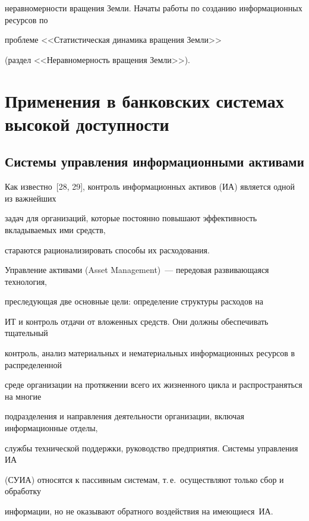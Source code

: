 неравномерности вращения Земли. Начаты работы по созданию информационных ресурсов по 


проблеме <<Статистическая динамика вращения Земли>>


(раздел <<Неравномерность вращения Земли>>).





\section{Применения в банковских системах высокой доступности}





\subsection*{Системы управления информационными активами}





Как известно~[28, 29], контроль информационных активов (ИА) является одной из важнейших 


задач для организаций, которые постоянно повышают эффективность вкладываемых ими средств, 


стараются рационализировать способы их расходования.


Управление активами (Asset Management)~--- передовая развивающаяся технология, 


преследующая две основные цели: определение структуры расходов на 


ИТ и контроль отдачи от вложенных средств. Они должны обеспечивать тщательный 


контроль, анализ материальных и нематериальных информационных ресурсов в распределенной 


среде организации на протяжении всего их жизненного цикла и распространяться на многие 


подразделения и направления деятельности организации, включая информационные отделы, 


службы технической поддержки, руководство предприятия. Системы управления ИА


(СУИА) относятся к пассивным системам, т.\,е.\ осуществляют только сбор и обработку 


информации, но не оказывают обратного воздействия на имеющиеся~ИА.





